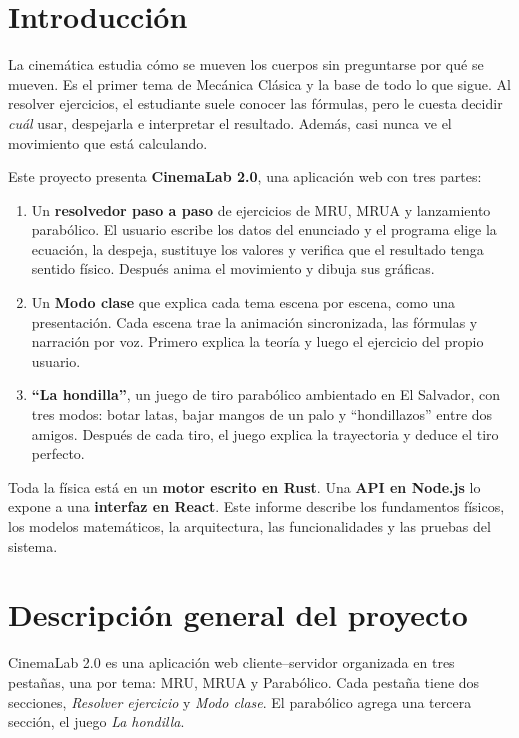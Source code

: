 \documentclass[11pt,letterpaper]{article}
\begin{document}
\tableofcontents
\clearpage

\section{Introducción}

La cinemática estudia cómo se mueven los cuerpos sin preguntarse por qué se mueven. Es el primer tema de Mecánica Clásica y la base de todo lo que sigue. Al resolver ejercicios, el estudiante suele conocer las fórmulas, pero le cuesta decidir \emph{cuál} usar, despejarla e interpretar el resultado. Además, casi nunca ve el movimiento que está calculando.

Este proyecto presenta \textbf{CinemaLab 2.0}, una aplicación web con tres partes:

\begin{enumerate}
  \item Un \textbf{resolvedor paso a paso} de ejercicios de MRU, MRUA y lanzamiento parabólico. El usuario escribe los datos del enunciado y el programa elige la ecuación, la despeja, sustituye los valores y verifica que el resultado tenga sentido físico. Después anima el movimiento y dibuja sus gráficas.
  \item Un \textbf{Modo clase} que explica cada tema escena por escena, como una presentación. Cada escena trae la animación sincronizada, las fórmulas y narración por voz. Primero explica la teoría y luego el ejercicio del propio usuario.
  \item \textbf{``La hondilla''}, un juego de tiro parabólico ambientado en El Salvador, con tres modos: botar latas, bajar mangos de un palo y ``hondillazos'' entre dos amigos. Después de cada tiro, el juego explica la trayectoria y deduce el tiro perfecto.
\end{enumerate}

Toda la física está en un \textbf{motor escrito en Rust}. Una \textbf{API en Node.js} lo expone a una \textbf{interfaz en React}. Este informe describe los fundamentos físicos, los modelos matemáticos, la arquitectura, las funcionalidades y las pruebas del sistema.

\section{Descripción general del proyecto}

CinemaLab 2.0 es una aplicación web cliente–servidor organizada en tres pestañas, una por tema: MRU, MRUA y Parabólico. Cada pestaña tiene dos secciones, \emph{Resolver ejercicio} y \emph{Modo clase}. El parabólico agrega una tercera sección, el juego \emph{La hondilla}.
\end{document}
